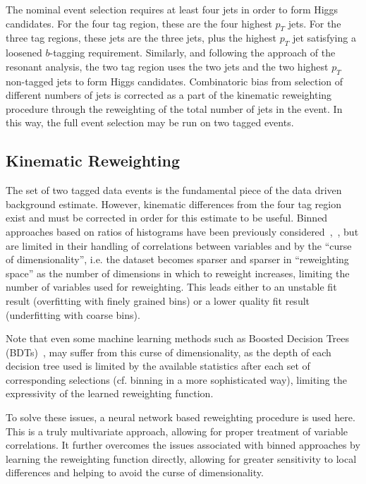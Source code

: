 The nominal event selection requires at least four jets in order to form Higgs
candidates. For the four tag region, these are the four highest $p_{T}$ \btagged 
jets. For the three tag regions, these jets are the three \btagged jets, plus the 
highest $p_{T}$ jet satisfying a loosened $b$-tagging requirement. Similarly, and following 
the approach of the resonant analysis, the two tag region uses the two \btagged jets 
and the two highest $p_{T}$ non-tagged jets to form Higgs candidates. Combinatoric bias 
from selection of different numbers of \btagged jets is corrected as a part of the kinematic 
reweighting procedure through the reweighting of the total number of jets in the event. In this way, 
the full event selection may be run on two tagged events. 

\subsection{Kinematic Reweighting}
The set of two tagged data events is the fundamental piece of the data driven
background estimate. However, kinematic differences from the four tag region
exist and must be corrected in order for this estimate to be useful. Binned 
approaches based on ratios of histograms have been previously considered~\cite{EXOT-2016-31},~\cite{HDBS-2018-18}, 
but are limited in their handling of correlations 
between variables and by the ``curse of dimensionality'', i.e. the dataset
becomes sparser and sparser in ``reweighting space'' as the number of dimensions
in which to reweight increases, limiting the number of variables used for reweighting. 
This leads either to an unstable fit result (overfitting with finely grained bins) or a 
lower quality fit result (underfitting with coarse bins).

Note that even some machine learning methods such as Boosted Decision Trees (BDTs)~\cite{BDT-RW}, may suffer
from this curse of dimensionality, as the depth of each decision tree used is limited by 
the available statistics after each set of corresponding selections (cf. binning in a 
more sophisticated way), limiting the expressivity of the learned reweighting function.

To solve these issues, a neural network based reweighting procedure is used
here. This is a truly multivariate approach, allowing for proper treatment of
variable correlations. It further overcomes the issues associated with binned
approaches by learning the reweighting function directly, allowing for greater
sensitivity to local differences and helping to avoid the curse of
dimensionality.


